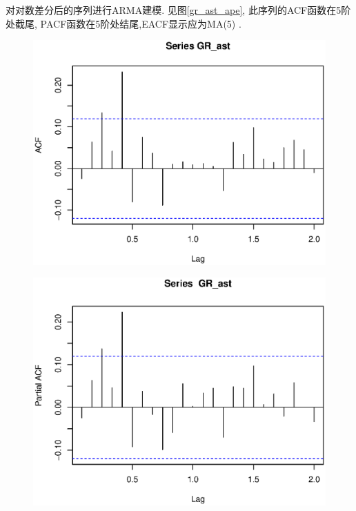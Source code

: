 对对数差分后的序列进行ARMA建模. 见图\ref{gr_ast_ape}, 此序列的ACF函数在5阶处截尾, PACF函数在5阶处结尾,EACF显示应为MA(5) .
\begin{figure}[h!]
	\begin{minipage}[ht]{0.3\textwidth}
		\centering
		\includegraphics[width=\textwidth]{pic/ast/acf(gr_ast)}
		\subcaption{}\label{acf(gr_ast)}
	\end{minipage}%
	\hspace{0.04\textwidth}
	\begin{minipage}[ht]{0.3\textwidth}
		\centering
		\includegraphics[width=\textwidth]{pic/ast/pacf(gr_ast)}
		\subcaption{}\label{pacf(gr_ast)}
	\end{minipage}

\end{figure}
